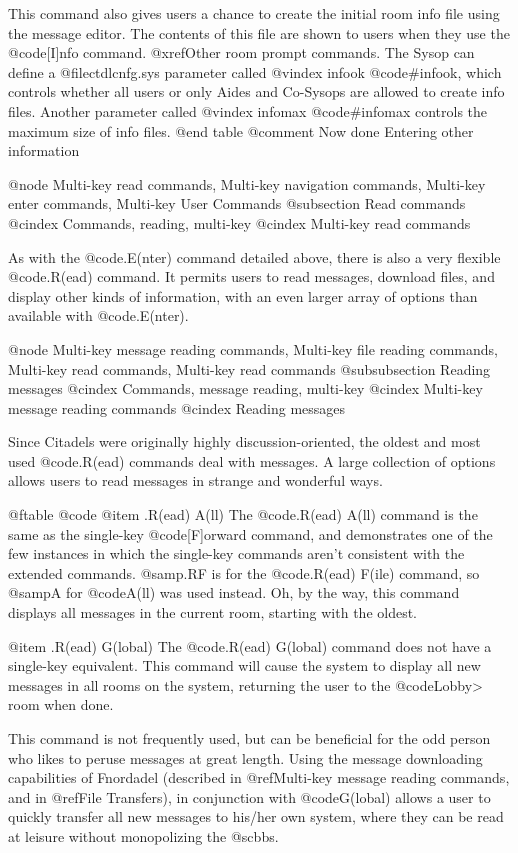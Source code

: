 This command also gives users a chance to create the initial room info file
using the message editor.  The contents of this file are shown to users when
they use the @code{[I]nfo} command.  @xref{Other room prompt commands}.  The
Sysop can define a @file{ctdlcnfg.sys} parameter called
@vindex infook
@code{#infook}, which controls whether all users or only Aides and Co-Sysops
are allowed to create info files.  Another parameter called
@vindex infomax
@code{#infomax} controls the maximum size of info files.
@end table
@comment Now done Entering other information

@node Multi-key read commands, Multi-key navigation commands, Multi-key enter commands, Multi-key User Commands
@subsection Read commands
@cindex Commands, reading, multi-key
@cindex Multi-key read commands

As with the @code{.E(nter)} command detailed above, there is also a very flexible
@code{.R(ead)} command.  It permits users to read messages, download files, and
display other kinds of information, with an even larger array of options than
available with @code{.E(nter)}.

@node Multi-key message reading commands, Multi-key file reading commands, Multi-key read commands, Multi-key read commands
@subsubsection Reading messages
@cindex Commands, message reading, multi-key
@cindex Multi-key message reading commands
@cindex Reading messages

Since Citadels were originally highly discussion-oriented, the oldest and most
used @code{.R(ead)} commands deal with messages.  A large collection of options
allows users to read messages in strange and wonderful ways.

@ftable @code
@item .R(ead) A(ll)
The @code{.R(ead) A(ll)} command is the same as the single-key
@code{[F]orward} command,
and demonstrates one of the few instances in which the single-key
commands aren't consistent with the extended commands.  @samp{.RF} is for the
@code{.R(ead) F(ile)} command, so @samp{A} for @code{A(ll)} was used instead.  Oh, by the
way, this command displays all messages in the current room, starting
with the oldest.

@item .R(ead) G(lobal)
The @code{.R(ead) G(lobal)} command does not have a single-key
equivalent.  This command will cause the system to
display all new messages in all rooms on the system, returning
the user to the @code{Lobby>} room when done.

This command is not frequently used, but can be beneficial for
the odd person who likes to peruse messages at great length.  Using the
message downloading capabilities of Fnordadel (described in @ref{Multi-key
message reading commands}, and in @ref{File Transfers}),
in conjunction with @code{G(lobal)} allows a user
to quickly transfer all new messages to his/her own system, where they
can be read at leisure without monopolizing the @sc{bbs}.

